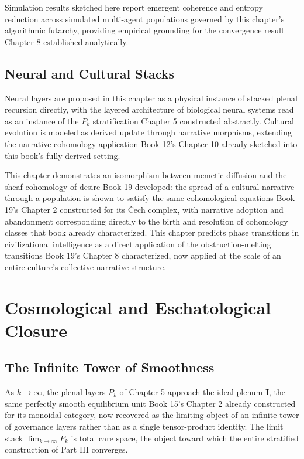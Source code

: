 Simulation results sketched here report emergent coherence and entropy reduction across simulated multi-agent populations governed by this chapter's algorithmic futarchy, providing empirical grounding for the convergence result Chapter 8 established analytically.

\chapter{Neural and Cultural Stacks}

Neural layers are proposed in this chapter as a physical instance of stacked plenal recursion directly, with the layered architecture of biological neural systems read as an instance of the $P_k$ stratification Chapter 5 constructed abstractly. Cultural evolution is modeled as derived update through narrative morphisms, extending the narrative-cohomology application Book 12's Chapter 10 already sketched into this book's fully derived setting.

This chapter demonstrates an isomorphism between memetic diffusion and the sheaf cohomology of desire Book 19 developed: the spread of a cultural narrative through a population is shown to satisfy the same cohomological equations Book 19's Chapter 2 constructed for its Čech complex, with narrative adoption and abandonment corresponding directly to the birth and resolution of cohomology classes that book already characterized. This chapter predicts phase transitions in civilizational intelligence as a direct application of the obstruction-melting transitions Book 19's Chapter 8 characterized, now applied at the scale of an entire culture's collective narrative structure.

\part{Cosmological and Eschatological Closure}

\chapter{The Infinite Tower of Smoothness}

As $k \to \infty$, the plenal layers $P_k$ of Chapter 5 approach the ideal plenum $\mathbf{I}$, the same perfectly smooth equilibrium unit Book 15's Chapter 2 already constructed for its monoidal category, now recovered as the limiting object of an infinite tower of governance layers rather than as a single tensor-product identity. The limit stack $\lim_{k \to \infty} P_k$ is total care space, the object toward which the entire stratified construction of Part III converges.


